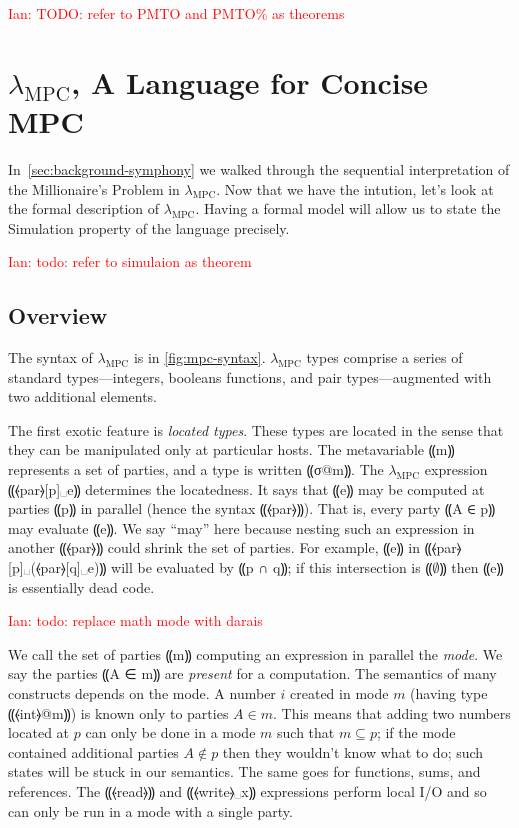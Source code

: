 \documentclass{report}
\newcommand{\mpc}{\ensuremath{\lambda_{\mathrm{MPC}}}\xspace}
\newcommand{\ins}[1]{\textcolor{red}{Ian: #1}}
\newcommand{\eset}{⸨∅⸩}
\begin{document}
\ins{TODO: refer to PMTO and PMTO\% as theorems}

\chapter{\mpc, A Language for Concise MPC}
\label{ch:lam-mpc}

In~\cref{sec:background-symphony} we walked through the sequential interpretation of the Millionaire's Problem in \mpc. Now that we have
the intution, let's look at the formal description of \mpc. Having a formal model will allow us to state the Simulation property of the
language precisely.

\ins{todo: refer to simulaion as theorem}

\section{Overview}
\label{sec:lam-mpc-overview}

The syntax of \mpc is in \cref{fig:mpc-syntax}. \mpc types comprise a
series of standard types---integers, booleans functions, and pair types---augmented
with two additional elements.

The first exotic feature is \emph{located types}. These types are located
in the sense that they can be manipulated only at particular hosts.
The metavariable ⸨m⸩ represents a set of parties, and a type is written ⸨σ@m⸩. The \mpc expression
⸨⦑par⦒[p]␣e⸩ determines the locatedness. It says that ⸨e⸩ may be computed at
parties ⸨p⸩ in parallel (hence the syntax ⸨⦑par⦒⸩). That is, every
party ⸨A ∈ p⸩ may evaluate ⸨e⸩. We say ``may'' here because
nesting such an expression in another ⸨⦑par⦒⸩ could shrink the set of
parties. For example, ⸨e⸩ in ⸨⦑par⦒[p]␣(⦑par⦒[q]␣e)⸩ will be
evaluated by ⸨p ∩ q⸩; if this intersection is $\eset$ then ⸨e⸩
is essentially dead code.

\ins{todo: replace math mode with darais}

We call the set of parties ⸨m⸩ computing an expression in parallel
the \emph{mode}. We say the parties ⸨A ∈ m⸩ are \emph{present}
for a computation. The semantics of many constructs depends on the
mode. A number $i$ created in mode $m$ (having type ⸨⦑int⦒@m⸩) is
known only to parties $A \in m$. This means that adding two numbers
located at $p$ can only be done in a mode $m$ such that
$m \subseteq p$; if the mode contained additional parties
$A \not\in p$ then they wouldn't know what to do; such states will be
stuck in our semantics. The same goes for functions, sums, and
references. The ⸨⦑read⦒⸩ and ⸨⦑write⦒␣x⸩ expressions perform local
I/O and so can only be run in a mode with a single party.
\end{document}

